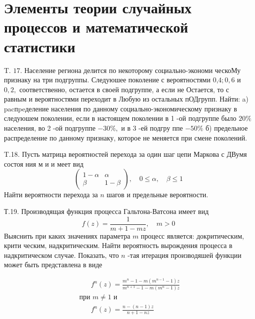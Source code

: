 \documentclass[a4paper,12pt]{article} %
\begin{document}
\section{Элементы теории случайных процессов и математической статистики}




\begin{example}


T. $17 .$ Население региона делится по некоторому социально-экономи ческоМу признаку на три подгруппы. Следуюшее поколение с вероятностями 0,$4 ; 0,6$ и $0,2,$ соответственно, остается в своей подгруппе, а если не
Остается, то с равным и вероятностями переходит в Любую из остальных пОДгрупп. Найти:
a) pacпpeделение населения по данному социально-экономическому признаку в следуюшем поколении, если в настоящем поколении в 1 -ой подгруппе было $20 \%$ населения, во 2 -ой подгруппе $-30 \%,$ и в 3 -ей подгру ппе $-50 \%$
б) предельное распределение по данному признаку, которое не меняется при смене поколений.



\end{example}



\begin{example}

T.18. Пусть матрица вероятностей перехода за один шаг цепи Маркова с
ДВумя состоя ния м и и меет вид
$$
\left(\begin{array}{cc}
1-\alpha & \alpha \\
\beta & 1-\beta
\end{array}\right), \quad 0 \leqslant \alpha, \quad \beta \leqslant 1
$$
Найти вероятности перехода за $n$ шагов и предельные вероятности.




\end{example}



\begin{example}

Т.19. Производящая функция процесса Гальтона-Ватсона имеет вид
$$
f(z)=\frac{1}{m+1-m z}, \quad m>0
$$
Выяснить при каких значениях параметра $m$ процесс является: докритическим, крити ческим, надкритическим. Найти вероятность вырождения процесса в надкритическом случае. Показать, что $n$ -тая итерация производяшей функции может быть представлена в виде

\begin{equation}\begin{array}{l}
\qquad f^{n}(z)=\frac{m^{n}-1-m\left(m^{n-1}-1\right) z}{m^{n+1}-1-m\left(m^{n}-1\right) z} \\
\text { при } m \neq 1 \text { и } \\
\qquad f^{n}(z)=\frac{n-(n-1) z}{n+1-n z}
\end{array}\end{equation}


\end{example}
\end{document}
